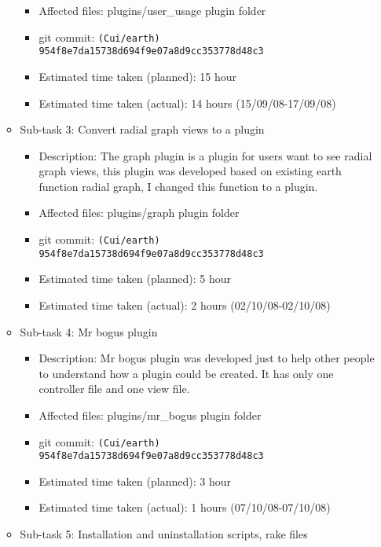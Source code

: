 \documentclass{article}
\begin{document}
\begin{itemize}
\begin{itemize}
\begin{itemize}
                    \item Affected files: plugins/user\_usage plugin folder
                    \item git commit: \texttt{(Cui/earth) 954f8e7da15738d694f9e07a8d9cc353778d48c3}
                    \item Estimated time taken (planned): 15 hour
                    \item Estimated time taken (actual): 14 hours (15/09/08-17/09/08)
                \end{itemize}
            \item Sub-task 3: Convert radial graph views to a plugin
                \begin{itemize}
                    \item Description: The graph plugin is a plugin for users want to see radial graph views, this plugin was developed based on existing earth function radial graph, I changed this function to a plugin.
                    \item Affected files: plugins/graph plugin folder
                    \item git commit: \texttt{(Cui/earth) 954f8e7da15738d694f9e07a8d9cc353778d48c3}
                    \item Estimated time taken (planned): 5 hour
                    \item Estimated time taken (actual): 2 hours (02/10/08-02/10/08)
                \end{itemize}
            \item Sub-task 4: Mr bogus plugin
                \begin{itemize}
                    \item Description: Mr bogus plugin was developed just to help other people to understand how a plugin could be created. It has only one controller file and one view file.
                    \item Affected files: plugins/mr\_bogus plugin folder
                    \item git commit: \texttt{(Cui/earth) 954f8e7da15738d694f9e07a8d9cc353778d48c3}
                    \item Estimated time taken (planned): 3 hour
                    \item Estimated time taken (actual): 1 hours (07/10/08-07/10/08)
                \end{itemize}
            \item Sub-task 5: Installation and uninstallation scripts, rake files

\end{itemize}
\end{itemize}
\end{document}

